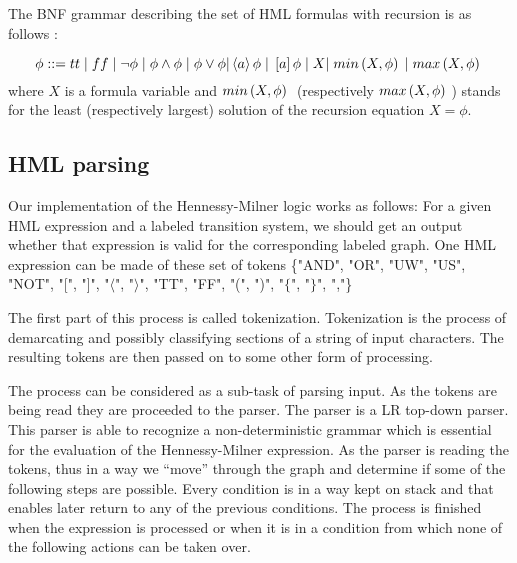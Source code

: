 The BNF grammar describing the set of HML formulas with recursion is as follows \cite{HMLRecursion}:

\begin{equation}\label{eq:hmlrec_bnf}
\phi ::= tt \hspace{1 mm} | \hspace{1 mm} ff \hspace{1 mm} | \hspace{1 mm} \neg\phi \hspace{1 mm} | \hspace{1 mm}\phi\wedge\phi \hspace{1 mm} |
\hspace{1 mm} \phi\vee\phi | \left\langle a\right\rangle \phi \hspace{1 mm} | \hspace{1 mm} \left[a\right]\phi \hspace{1 mm} | \hspace{1 mm} X | \hspace{1 mm} min\left(X,\phi \right) \hspace{1 mm} | \hspace{1 mm} max\left(X,\phi \right) \hspace{1 mm}
\end{equation}
where $X$ is a formula variable and $min\left(X,\phi\right) \hspace{1 mm}$ (respectively $max\left(X,\phi\right) \hspace{1 mm}$) stands for the least (respectively largest) solution of the recursion equation $X = \phi$.

\subsection{HML parsing}
Our implementation of the Hennessy-Milner logic works as follows: For a given HML expression and a labeled transition system, we should get an output whether that expression is valid for the corresponding labeled graph. One HML expression can be made of these set of tokens \{"AND", "OR", "UW", "US", "NOT", "[", "]", "$\langle$", "$\rangle$", "TT", "FF", "(", ")", "$\{$", "$\}$", ","\}

The first part of this process is called tokenization. Tokenization is the process of demarcating and possibly classifying sections of a string of input characters. The resulting tokens are then passed on to some other form of processing.

The process can be considered as a sub-task of parsing input. As the tokens are being read they are proceeded to the parser. The parser is a LR top-down parser. This parser is able to recognize a non-deterministic grammar which is essential for the evaluation of the Hennessy-Milner expression. As the parser is reading the tokens, thus in a way we “move” through the graph and determine if some of the following steps are possible. Every condition is in a way kept on stack and that enables later return to any of the previous conditions. The process is finished when the expression is processed or when it is in a condition from which none of the following actions can be taken over.

